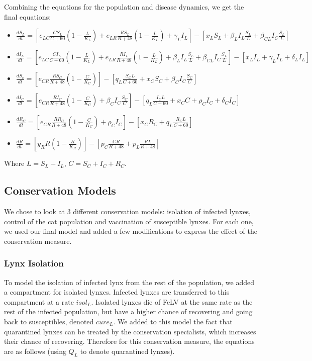 \documentclass[12pt]{article}
\begin{document}
\quad Combining the equations for the population and disease dynamics, we get the final equations:

\begin{itemize}
	\item $\frac{dS_{L}}{dt} = [e_{LC}\frac{CS_{L}}{C + 60}(1 - \frac{L}{K_{L}}) + e_{LR}\frac{RS_{L}}{R + 48}(1 - \frac{L}{K_{L}}) + \gamma_{L}I_{L}] - [x_{L}S_{L} + \beta_{L}I_{L}\frac{S_{L}}{L} + \beta_{CL}I_{C}\frac{S_{L}}{L}]$
	\item $\frac{dI_{L}}{dt} = [e_{LC}\frac{CI_{L}}{C + 60}(1 - \frac{L}{K_{L}}) + e_{LR}\frac{RI_{L}}{R + 48}(1 - \frac{L}{K_{L}}) + \beta_{L}I_{L}\frac{S_{L}}{L} + \beta_{CL}I_{C}\frac{S_{L}}{L}] - [x_{L}I_{L} + \gamma_{L}I_{L} + \delta_{L}I_{L}]$
	\item $\frac{dS_{c}}{dt} = [e_{CR}\frac{RS_{C}}{R + 48}(1 - \frac{C}{K_{C}})] - [q_{L}\frac{S_{C}L}{C + 60} + x_{C}S_{C} + \beta_{C}I_{C}\frac{S_{C}}{C}]$
	\item $\frac{dI_{C}}{dt} = [e_{CR}\frac{RI_{C}}{R + 48}(1 - \frac{C}{K_{C}})  + \beta_{C}I_{C}\frac{S_{C}}{C}] - [q_{L}\frac{I_{C}L}{C + 60} + x_{C}C + \rho_{C}I_{C} + \delta_{C}I_{C}] $
	\item $\frac{dR_{C}}{dt} = [e_{CR}\frac{RR_{C}}{R + 48}(1 - \frac{C}{K_{C}}) + \rho_{C}I_{C}] - [x_{C}R_{C} + q_{L}\frac{R_{C}L}{C + 60}]$
	\item $\frac{dR}{dt} = [y_{R}R(1 - \frac{R}{K_{R}})] - [p_{C}\frac{CR}{R + 48} + p_{L}\frac{RL}{R + 48}]$
\end{itemize}
Where $L = S_{L} + I_{L}$, $C = S_{C} + I_{C} + R_{C}$.

\subsection{Conservation Models}
\quad We chose to look at 3 different conservation models: isolation of infected lynxes, control of the cat population and vaccination of susceptible lynxes. For each one, we used our final model and added a few modifications to express the effect of the conservation measure.

\subsubsection{Lynx Isolation}
\quad To model the isolation of infected lynx from the rest of the population, we added a compartment for isolated lynxes. Infected lynxes are transferred to this compartment at a rate $isol_{L}$. Isolated lynxes die of FeLV at the same rate as the rest of the infected population, but have a higher chance of recovering and going back to susceptibles, denoted $cure_{L}$. We added to this model the fact that quarantined lynxes can be treated by the conservation specialists, which increases their chance of recovering. Therefore for this conservation measure, the equations are as follows (using $Q_{L}$ to denote quarantined lynxes). 
\end{document}
